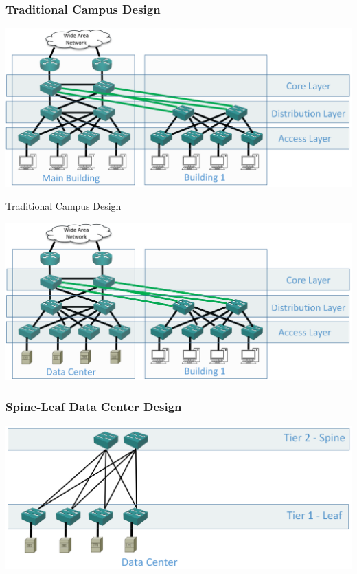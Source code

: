 \documentclass[pdflatex,compress,mathserif]{beamer}
\begin{document}
\begin{frame}
	\frametitle{Traditional Campus Design}
	\begin{center}
		\includegraphics[width=\linewidth]{img/img05}
	\end{center}
\end{frame}

\begin{frame}{Traditional Campus Design}
	\begin{center}
		\includegraphics[width=\linewidth]{img/img06}
	\end{center}
\end{frame}

\begin{frame}
	\frametitle{Spine-Leaf Data Center Design}
	\begin{center}
		\includegraphics[width=\linewidth]{img/img07}
	\end{center}
\end{frame}
\end{document}
